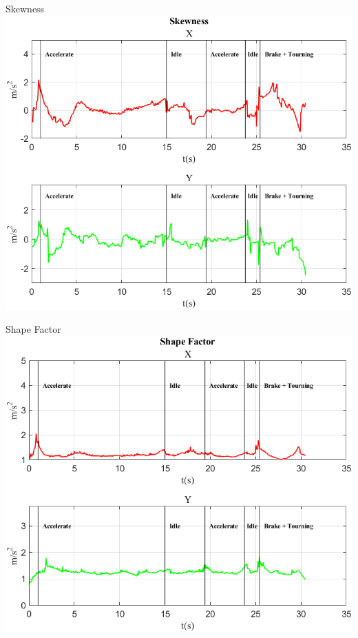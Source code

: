 \documentclass[beamer]{standalone}
\begin{document}
	\begin{frame}{{Skewness}}
		\centering\includegraphics[height=.8\textheight]{figure/Acc/Skewness}
	\end{frame}
	
	\begin{frame}{{Shape Factor}}
		\centering\includegraphics[height=.8\textheight]{figure/Acc/Shape Factor}
	\end{frame}
	
\end{document}
